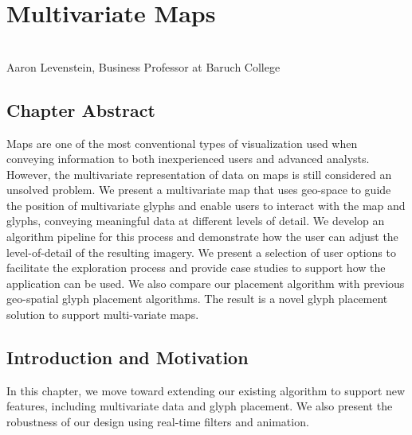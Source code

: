 \chapter{Multivariate Maps}
\label{chap:MultivariateMaps}
 \cite{mcnabb2019multivariate} \\
{Aaron Levenstein, Business Professor at Baruch College}



\newpage
{\footnotesize \hypersetup{linkcolor=black}
\minitoc}

\newpage
{}
\vspace*{4cm}
\section*{Chapter Abstract}
Maps are one of the most conventional types of visualization used when conveying information to both inexperienced users and advanced analysts. However, the multivariate representation of data on maps is still considered an unsolved problem. We present a multivariate map that uses geo-space to guide the position of  multivariate glyphs and enable users to interact with the map and glyphs, conveying meaningful data at different levels of detail. We develop an algorithm pipeline for this process and demonstrate how the user can adjust the level-of-detail of the resulting imagery. We present a selection of user options to facilitate the exploration process and provide case studies to support how the application can be used. We also compare our placement algorithm with previous geo-spatial glyph placement algorithms. The result is a novel glyph placement solution to support multi-variate maps.
\clearpage
\section{Introduction and Motivation}
In this chapter, we move toward extending our existing algorithm to support new features, including multivariate data and glyph placement. We also present the robustness of our design using real-time filters and animation.

